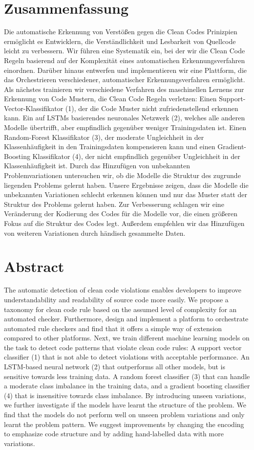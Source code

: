\section*{Zusammenfassung}

Die automatische Erkennung von Verstößen gegen die Clean Codes Prinizpien ermöglicht es Entwicklern, die Verständlichkeit und Lesbarkeit von Quellcode leicht zu verbessern. Wir führen eine Systematik ein, bei der wir die Clean Code Regeln basierend auf der Komplexität eines automatischen Erkennungsverfahren einordnen. Darüber hinaus entwerfen und implementieren wir eine Plattform, die das Orchestrieren verschiedener, automatischer Erkennungsverfahren ermöglicht. Als nächstes trainieren wir verschiedene Verfahren des maschinellen Lernens zur Erkennung von Code Mustern, die Clean Code Regeln verletzen: Einen Support-Vector-Klassifikator (1), der die Code Muster nicht zufriedenstellend erkennen kann. Ein auf LSTMs basierendes neuronales Netzwerk (2), welches alle anderen Modelle übertrifft, aber empfindlich gegenüber weniger Trainingsdaten ist. Einen Random-Forest Klassifikator (3), der moderate Ungleichheit in der Klassenhäufigkeit in den Trainingsdaten kompensieren kann und einen Gradient-Boosting Klassifikator (4), der nicht empfindlich gegenüber Ungleichheit in der Klassenhäufigkeit ist. Durch das Hinzufügen von unbekannten Problemvariationen untersuchen wir, ob die Modelle die Struktur des zugrunde liegenden Problems gelernt haben. Unsere Ergebnisse zeigen, dass die Modelle die unbekannten Variationen schlecht erkennen können und nur das Muster statt der Struktur des Problems gelernt haben. Zur Verbesserung schlagen wir eine Veränderung der Kodierung des Codes für die Modelle vor, die einen größeren Fokus auf die Struktur des Codes legt. Außerdem empfehlen wir das Hinzufügen von weiteren Variationen durch händisch gesammelte Daten.
 
\newpage
\section*{Abstract}    
The automatic detection of clean code violations enables developers to improve understandability and readability of source code more easily. We propose a taxonomy for clean code rule based on the assumed level of complexity for an automated checker. Furthermore, design and implement a platform to orchestrate automated rule checkers and find that it offers a simple way of extension compared to other platforms. Next, we train different machine learning models on the task to detect code patterns that violate clean code rules: A support vector classifier (1) that is not able to detect violations with acceptable performance. An LSTM-based neural network (2) that outperforms all other models, but is sensitive towards less training data. A random forest classifier (3) that can handle a moderate class imbalance in the training data, and a gradient boosting classifier (4) that is insensitive towards class imbalance. By introducing unseen variations, we further investigate if the models have learnt the structure of the problem. We find that the models do not perform well on unseen problem variations and only learnt the problem pattern. We suggest improvements by changing the encoding to emphasize code structure and by adding hand-labelled data with more variations.